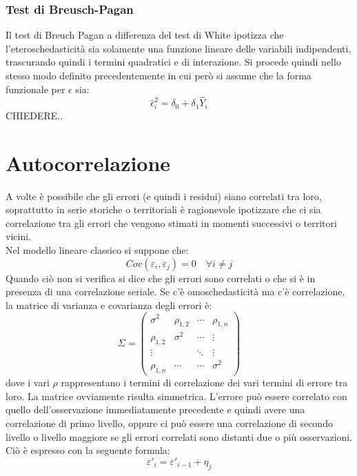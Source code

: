 \subsubsection{Test di Breusch-Pagan}
Il test di Breuch Pagan a differenza del test di White ipotizza che l'eteroschedasticità sia solamente una funzione lineare delle variabili indipendenti, trascurando quindi i termini quadratici e di interazione. Si procede quindi nello stesso modo definito precedentemente in cui però si assume che la forma funzionale per $\epsilon$ sia:
\begin{equation}
\hat{\epsilon}_i^2 = \delta_0 + \delta_1\hat{Y}_i
\end{equation}
CHIEDERE..
\section{Autocorrelazione}
A volte è possibile che gli errori (e quindi i residui) siano correlati tra loro, soprattutto in serie storiche o territoriali è ragionevole ipotizzare che ci sia correlazione tra gli errori che vengono stimati in momenti successivi o territori vicini.\\
Nel modello lineare classico si suppone che:
\begin{equation}
Cov(\varepsilon_i, \varepsilon_j) = 0 \quad \forall i \neq j
\end{equation}
Quando ciò non si verifica si dice che gli errori sono correlati o che si è in presenza di una correlazione seriale. Se c'è omoschedasticità ma c'è correlazione, la matrice di varianza e covarianza degli errori è:
\begin{equation}
\Sigma = \begin{pmatrix}
\sigma^2 & \rho_{1,2} & \cdots & \rho_{1,n} \\ 
\rho_{1,2} & \sigma^2 & \cdots & \vdots \\ 
\vdots &  & \ddots & \vdots \\ 
\rho_{1,n} & \cdots & \cdots & \sigma^2
\end{pmatrix} 
\end{equation}
dove i vari $\rho$ rappresentano i termini di correlazione dei vari termini di errore tra loro. La matrice ovviamente risulta simmetrica.
L'errore può essere correlato con quello dell'osservazione immediatamente precedente e quindi avere una correlazione di primo livello, oppure ci può essere una correlazione di secondo livello o livello maggiore se gli errori correlati sono distanti due o più osservazioni. Ciò è espresso con la seguente formula:
\begin{equation}
\varepsilon'_i = \varepsilon'_{i-1} + \eta_j
\end{equation}
